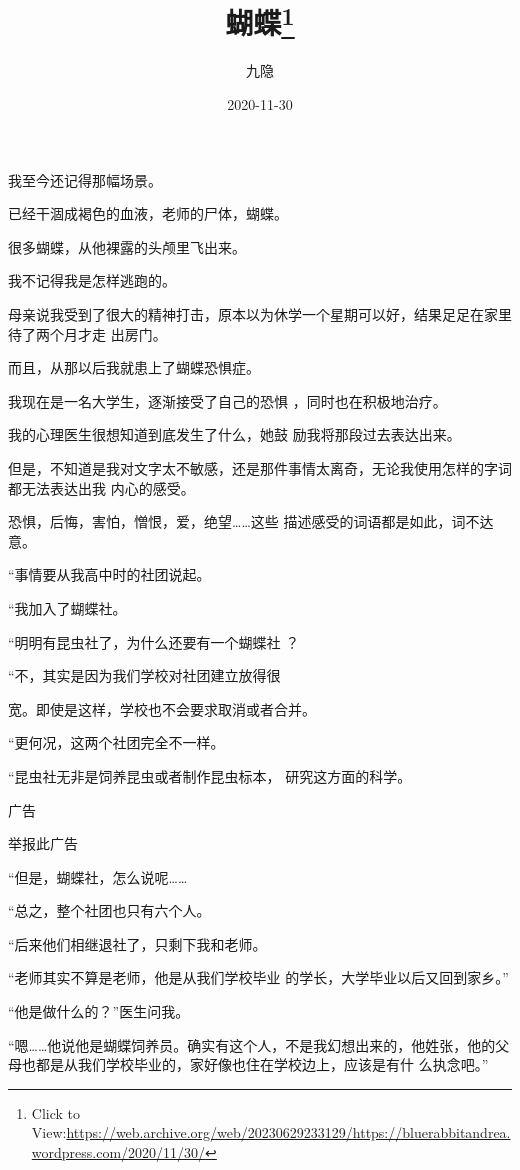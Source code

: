 \documentclass{article}
\title{蝴蝶\footnote{Click to View:\url{https://web.archive.org/web/20230629233129/https://bluerabbitandrea.wordpress.com/2020/11/30/}}}
\author{九隐}
\date{2020-11-30}
\begin{document}

\maketitle


\Large


﻿我至今还记得那幅场景。 

已经干涸成褐色的血液，老师的尸体，蝴蝶。
 


很多蝴蝶，从他裸露的头颅里飞出来。 


我不记得我是怎样逃跑的。 

母亲说我受到了很大的精神打击，原本以为休学一个星期可以好，结果足足在家里待了两个月才走
出房门。 


而且，从那以后我就患上了蝴蝶恐惧症。 

\newpage

我现在是一名大学生，逐渐接受了自己的恐惧
，同时也在积极地治疗。 

我的心理医生很想知道到底发生了什么，她鼓
励我将那段过去表达出来。 

但是，不知道是我对文字太不敏感，还是那件事情太离奇，无论我使用怎样的字词都无法表达出我
内心的感受。 

恐惧，后悔，害怕，憎恨，爱，绝望……这些
描述感受的词语都是如此，词不达意。 


“事情要从我高中时的社团说起。 


“我加入了蝴蝶社。 

“明明有昆虫社了，为什么还要有一个蝴蝶社
？ 

“不，其实是因为我们学校对社团建立放得很
\newpage

宽。即使是这样，学校也不会要求取消或者合并。 


“更何况，这两个社团完全不一样。 

“昆虫社无非是饲养昆虫或者制作昆虫标本，
研究这方面的科学。 


广告 


举报此广告 


“但是，蝴蝶社，怎么说呢…… 


“总之，整个社团也只有六个人。 


“后来他们相继退社了，只剩下我和老师。 

“老师其实不算是老师，他是从我们学校毕业
的学长，大学毕业以后又回到家乡。” 


\newpage

“他是做什么的？”医生问我。 

“嗯……他说他是蝴蝶饲养员。确实有这个人，不是我幻想出来的，他姓张，他的父母也都是从我们学校毕业的，家好像也住在学校边上，应该是有什
么执念吧。” 
\end{document}
